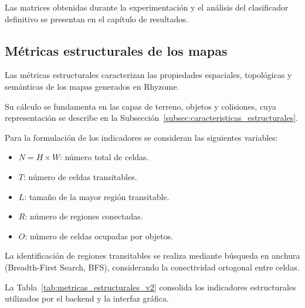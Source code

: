 Las matrices obtenidas durante la experimentación y el análisis del clasificador definitivo se presentan en el capítulo de resultados.


\subsection{Métricas estructurales de los mapas}
\label{subsec:metricas_estructurales}

Las métricas estructurales caracterizan las propiedades espaciales, topológicas y semánticas de los mapas generados en Rhyzome.

Su cálculo se fundamenta en las capas de terreno, objetos y colisiones, cuya representación se describe en la Subsección~\ref{subsec:caracteristicas_estructurales}.

Para la formulación de los indicadores se consideran las siguientes variables:

\begin{itemize}
	\item $N=H \times W$: número total de celdas.
	\item $T$: número de celdas transitables.
	\item $L$: tamaño de la mayor región transitable.
	\item $R$: número de regiones conectadas.
	\item $O$: número de celdas ocupadas por objetos.
\end{itemize}

La identificación de regiones transitables se realiza mediante búsqueda en anchura (Breadth-First Search, BFS), considerando la conectividad ortogonal entre celdas.

La Tabla~\ref{tab:metricas_estructurales_v2} consolida los indicadores estructurales utilizados por el backend y la interfaz gráfica.

